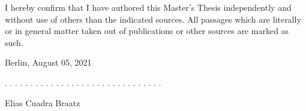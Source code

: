 \documentclass[a4paper,11pt]{article}
\newcommand{\thesistype}{Master's Thesis}
\newcommand{\thesisauthor}{Elias Cuadra Braatz}
\newcommand{\thesisdate}{August 05, 2021}
\begin{document}
I hereby confirm that I have authored this \thesistype{} independently and
without use of others than the indicated sources. All passages which are
literally or in general matter taken out of publications or other sources are
marked as such.
\vspace{1cm}

Berlin, \thesisdate{}
\vspace{3cm}

. . . . . . . . . . . . . . . . . . . . . . . . . . . . . . .
\vspace{0.1cm}

\thesisauthor{}
\end{document}
